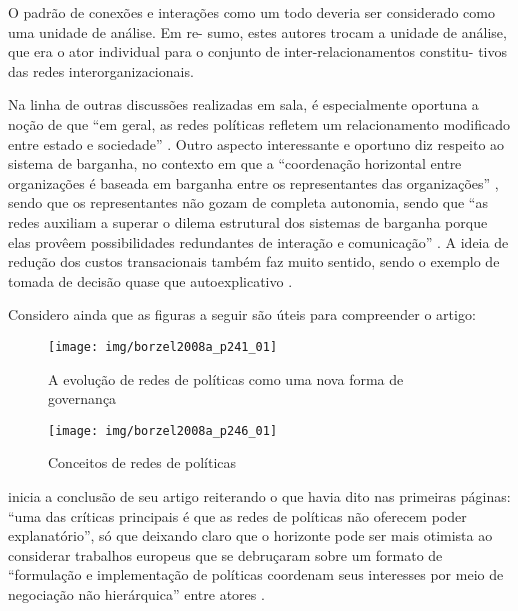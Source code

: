\documentclass[
article,			%
11pt,				%
oneside,			%
a4paper,			%
english,			%
brazil,				%
sumario=tradicional
]{abntex2}
\begin{document}
	\begin{citacao}
		O padrão de conexões e interações como um todo deveria ser considerado como uma unidade de análise. Em re-
		sumo, estes autores trocam a unidade de análise, que era o ator
		individual para o conjunto de inter-relacionamentos constitu-
		tivos das redes interorganizacionais. \cite[p. 233]{borzel2008a}
	\end{citacao}

	Na linha de outras discussões realizadas em sala, é especialmente oportuna a noção de que ``em geral, as redes políticas refletem um relacionamento modificado entre estado e sociedade'' \cite[p. 235]{borzel2008a}. Outro aspecto interessante e oportuno diz respeito ao sistema de barganha, no contexto em que a ``coordenação horizontal entre organizações é baseada em barganha entre os representantes das	organizações'' \cite[p. 237]{borzel2008a}, sendo que os representantes não gozam de completa autonomia, sendo que ``as redes auxiliam a superar o dilema estrutural dos sistemas de barganha porque elas provêem
	possibilidades redundantes de interação e comunicação'' \cite[p. 240]{borzel2008a}. A ideia de redução dos custos transacionais também faz muito sentido, sendo o exemplo de tomada de decisão quase que autoexplicativo \cite[p. 240]{borzel2008a}.
	
	Considero ainda que as figuras a seguir são úteis para compreender o artigo:
	
	\begin{figure}[h]
		\centering
		\caption{A evolução de redes de políticas como uma nova forma de governança}
		\label{fig:borzel2008ap24101}
		\texttt{[image: img/borzel2008a\_p241\_01]}
	\end{figure}
	
	\begin{figure}[h]
		\centering
		\caption{Conceitos de redes de políticas}
		\label{fig:borzel2008ap24601}
		\texttt{[image: img/borzel2008a\_p246\_01]}
	\end{figure}

	 inicia a conclusão de seu artigo reiterando o que havia dito nas primeiras páginas: ``uma das críticas principais é que as redes de políticas não oferecem poder explanatório'', só que deixando claro que o horizonte pode ser mais otimista ao considerar trabalhos europeus que se debruçaram sobre um formato de ``formulação e implementação de políticas coordenam seus interesses por meio de negociação não hierárquica'' entre atores \cite[p. 248]{borzel2008a}.
	
\end{document}
